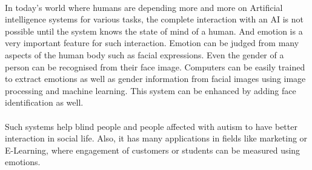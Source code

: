 \thispagestyle{plain}
\paragraph{} In today's world where humans are depending more and more on Artificial intelligence systems for various tasks, the complete interaction with an AI is not possible until the system knows the state of mind of a human. And emotion is a very important feature for such interaction. Emotion can be judged from many aspects of the human body such as facial expressions. Even the gender of a person can be recognised from their face image. Computers can be easily trained to extract emotions as well as gender information from facial images using image processing and machine learning. This system can be enhanced by adding face identification as well.
\paragraph{} Such systems help blind people and people affected with autism to have better interaction in social life. Also, it has many applications in fields like marketing or E-Learning, where engagement of customers or students can be measured using emotions.		
\newline
